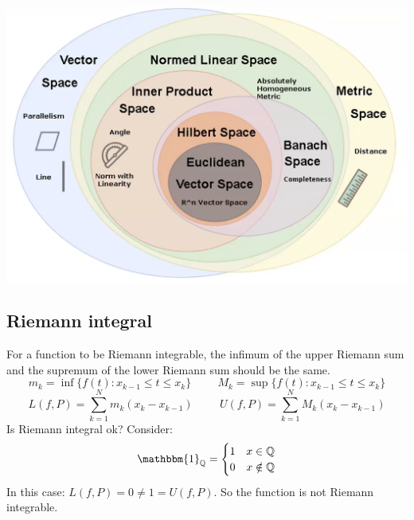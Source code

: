\begin{center}
    \includegraphics[scale = 0.2]{../images/SetsSpace.png}
\end{center}

\subsection{Riemann integral}
For a function to be Riemann integrable, the infimum of the upper Riemann sum and the supremum of the lower Riemann sum should be the same.
\[
    m_k = \inf\{f(t):x_{k-1} \leq t\leq x_k\} \hspace{1cm} M_k = \sup\{f(t):x_{k-1} \leq t\leq x_k\}    
\]
\[
    L(f,P) = \sum_{k=1}^N m_k(x_k - x_{k-1}) \hspace{1cm} U(f,P) = \sum_{k=1}^N M_k(x_k - x_{k-1})    
\]
Is Riemann integral ok? Consider:
\[
    \mathbbm{1}_{\mathbb{Q}} = \begin{cases}
        1 & x \in \mathbb{Q}\\
        0 & x \notin \mathbb{Q}
    \end{cases}    
\]
In this case: $L(f,P) = 0 \neq 1 = U(f,P)$. So the function is not Riemann integrable. 

